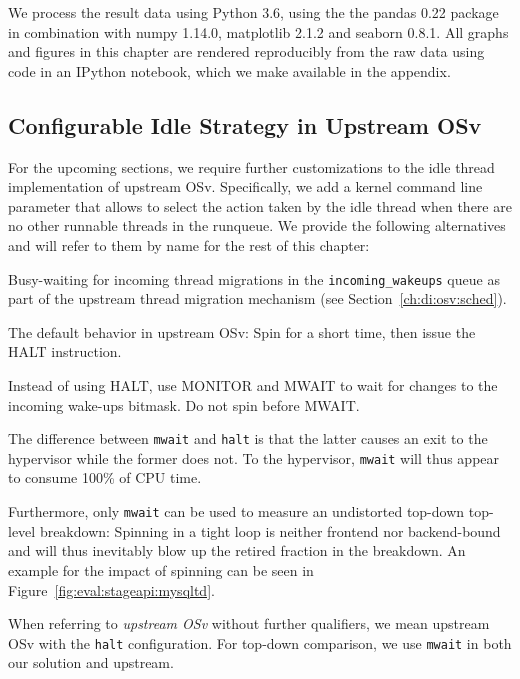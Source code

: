 \documentclass[12pt,a4paper]{book}
\begin{document}
We process the result data using Python 3.6, using the the pandas 0.22 package in combination with numpy 1.14.0, matplotlib 2.1.2 and seaborn 0.8.1.
All graphs and figures in this chapter are rendered reproducibly from the raw data using code in an IPython notebook, which we make available in the appendix.

\subsection{Configurable Idle Strategy in Upstream OSv}\label{ch:eval:setup:idle}

For the upcoming sections, we require further customizations to the idle thread implementation of upstream OSv.
Specifically, we add a kernel command line parameter that allows to select the action taken by the idle thread when there are no other runnable threads in the runqueue.
We provide the following alternatives and will refer to them by name for the rest of this chapter:
\begin{description}[labelwidth=3em,leftmargin=3.5em]
    \item[\texttt{busy}] Busy-waiting for incoming thread migrations in the \lstinline[style=figurecpp]{incoming_wakeups} queue as part of the upstream thread migration mechanism (see Section~\ref{ch:di:osv:sched}).
    \item[\texttt{halt}] The default behavior in upstream OSv: Spin for a short time, then issue the HALT instruction.
    \item[\texttt{mwait}] Instead of using HALT, use MONITOR and MWAIT to wait for changes to the incoming wake-ups bitmask. Do not spin before MWAIT.
\end{description}
The difference between \texttt{mwait} and \texttt{halt} is that the latter causes an exit to the hypervisor while the former does not.
To the hypervisor, \texttt{mwait} will thus appear to consume 100\% of CPU time.

Furthermore, only \texttt{mwait} can be used to measure an undistorted top-down top-level breakdown:
Spinning in a tight loop is neither frontend nor backend-bound and will thus inevitably blow up the retired fraction in the breakdown.
An example for the impact of spinning can be seen in Figure~\ref{fig:eval:stageapi:mysqltd}.

When referring to \emph{upstream OSv} without further qualifiers, we mean upstream OSv with the \texttt{halt} configuration.
For top-down comparison, we use \texttt{mwait} in both our solution and upstream.
\end{document}
